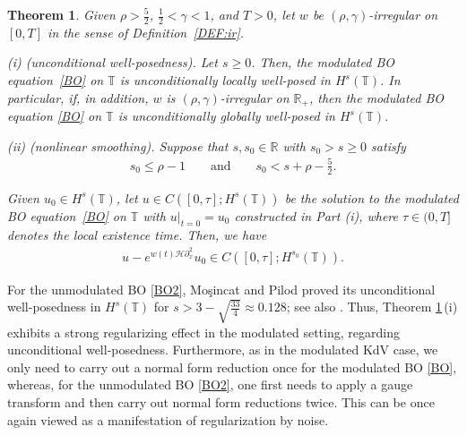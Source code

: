 \documentclass[letterpaper, 11pt,  reqno]{amsart}
\newtheorem{theorem}{Theorem} [section]
\newcommand{\1}{\hspace{0.5mm}\text{I}\hspace{0.5mm}}
\newcommand{\noi}{\noindent}
\newcommand{\R}{\mathbb{R}}
\newcommand{\T}{\mathbb{T}}
\renewcommand{\H}{\mathcal{H}}
\newcommand{\g}{\gamma}
\newcommand{\dx}{\partial_x}
\numberwithin{equation}{section}
\numberwithin{theorem}{section}
\begin{document}
\begin{theorem}\label{THM:UU2}
Given $\rho > \frac 52$,  $\frac12< \g < 1$, and $T> 0$, 
let  $w$ be $(\rho,\g)$-irregular on $[0, T]$ in the sense of Definition~\ref{DEF:ir}.


\smallskip

\noi
\textup{(i) (unconditional well-posedness).} 
Let   $s\ge 0$.
Then, the modulated BO equation~\eqref{BO}
on  $\T$
is unconditionally locally well-posed in $H^s(\T)$.
In particular, 
if, in addition, $w$ is  $(\rho,\g)$-irregular  on $\R_+$, 
then the modulated BO equation \eqref{BO}
on  $\T$
is unconditionally globally well-posed in $H^s(\T)$.

\smallskip

\noi
\textup{(ii) (nonlinear smoothing).} 
Suppose that 
$s, s_0 \in \R$ with 
$s_0 > s\ge 0$   satisfy
\begin{align*}
s_0 \le  \rho - 1
\qquad \text{and}\qquad 
s_0 < s + \rho - \frac 52.
\end{align*}



\noi
Given $u_0 \in H^s(\T)$, 
let $u
\in C([0, \tau]; H^s(\T))$ be the  solution 
to the modulated BO equation~\eqref{BO}
on $\T$
with $u|_{t = 0} = u_0$
constructed in Part (i), 
where 
$\tau \in (0,  T]$ denotes the local existence time.
Then, we have 
\begin{align*}
 u - e^{w(t) \H\dx^2}u_0 \in C([0, \tau]; H^{s_0}(\T)).
\end{align*}



\end{theorem}

%



For the unmodulated BO \eqref{BO2}, 
Mo\c{s}incat and Pilod
proved
its unconditional well-posedness
in $H^s(\T)$ for $s >  3 - \sqrt{\frac {33}4} \approx 0.128$;
see also \cite{Ki3}.
Thus, Theorem \ref{THM:UU2}\,(i)
exhibits a strong regularizing effect in the modulated setting, 
regarding  unconditional well-posedness.
Furthermore, as in the modulated KdV case, 
we only need to carry out a normal form reduction
once for the modulated BO \eqref{BO}, whereas, for the unmodulated BO \eqref{BO2}, 
one first needs to apply a gauge transform 
and then carry out normal form reductions twice.
This  can be once again viewed as a manifestation
of regularization by noise.
\end{document}
